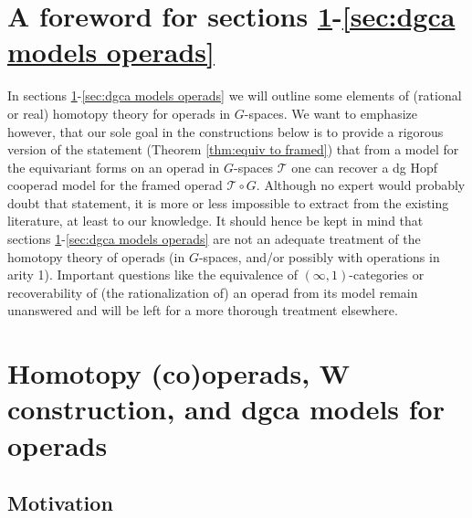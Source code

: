 \documentclass[a4paper]{amsart}
\theoremstyle{plain}
\theoremstyle{definition}
\newcommand{\op}{\mathcal}
\begin{document}
\section*{A foreword for sections \ref{sec:homotopy operads}-\ref{sec:dgca models operads}}
In sections \ref{sec:homotopy operads}-\ref{sec:dgca models operads} we will outline some elements of (rational or real) homotopy theory for operads in $G$-spaces.
We want to emphasize however, that our sole goal in the constructions below is to provide a rigorous version of the statement (Theorem \ref{thm:equiv to framed}) that from a model for the equivariant forms on an operad in $G$-spaces $\op T$ one can recover a dg Hopf cooperad model for the framed operad $\op T \circ G$.
Although no expert would probably doubt that statement, it is more or less impossible to extract from the existing literature, at least to our knowledge.
It should hence be kept in mind that sections \ref{sec:homotopy operads}-\ref{sec:dgca models operads} are not an adequate treatment of the homotopy theory of operads (in $G$-spaces, and/or possibly with operations in arity 1).
Important questions like the equivalence of $(\infty,1)$-categories or recoverability of (the rationalization of) an operad from its model remain unanswered and will be left for a more thorough treatment elsewhere.


\section{Homotopy (co)operads, W construction, and dgca models for operads}\label{sec:homotopy operads}

\subsection{Motivation}
\end{document}
